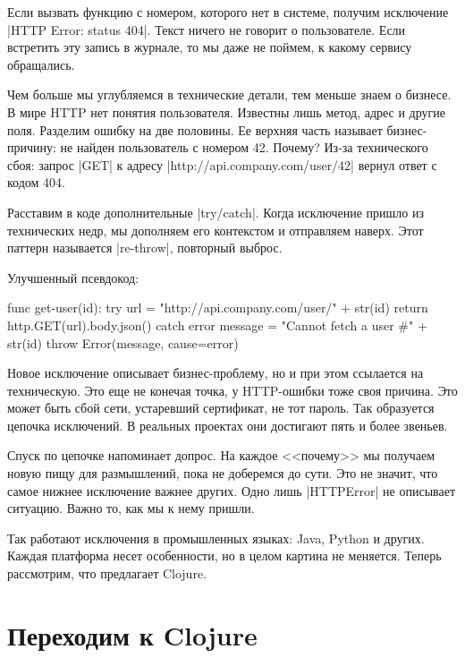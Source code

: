 Если вызвать функцию с номером, которого нет в системе, получим исключение
\spverb|HTTP Error: status 404|. Текст ничего не говорит о пользователе. Если
встретить эту запись в журнале, то мы даже не поймем, к какому сервису
обращались.

Чем больше мы углубляемся в технические детали, тем меньше знаем о бизнесе. В
мире HTTP нет понятия пользователя. Известны лишь метод, адрес и другие
поля. Разделим ошибку на две половины. Ее верхняя часть называет бизнес-причину:
не найден пользователь с номером 42. Почему? Из-за технического сбоя: запрос
\spverb|GET| к адресу \spverb|http://api.company.com/user/42| вернул ответ с
кодом 404.

Расставим в коде дополнительные \spverb|try/catch|. Когда исключение пришло из
технических недр, мы дополняем его контекстом и отправляем наверх. Этот паттерн
называется \spverb|re-throw|, повторный выброс.

Улучшенный псевдокод:

\begin{english}
  \begin{js}
func get-user(id):
  try {
    url = "http://api.company.com/user/" + str(id)
    return http.GET(url).body.json()
  } catch error {
    message = "Cannot fetch a user #" + str(id)
    throw Error(message, cause=error)
  }
  \end{js}
\end{english}

Новое исключение описывает бизнес-проблему, но и при этом ссылается на
техническую. Это еще не конечая точка, у HTTP-ошибки тоже своя причина. Это
может быть сбой сети, устаревший сертификат, не тот пароль. Так образуется
цепочка исключений. В реальных проектах они достигают пять и более звеньев.

Спуск по цепочке напоминает допрос. На каждое <<почему>> мы получаем новую пищу
для размышлений, пока не доберемся до сути. Это не значит, что самое нижнее
исключение важнее других. Одно лишь \spverb|HTTPError| не описывает
ситуацию. Важно то, как мы к нему пришли.

Так работают исключения в промышленных языках: Java, Python и других. Каждая
платформа несет особенности, но в целом картина не меняется. Теперь рассмотрим,
что предлагает Clojure.

\section{Переходим к Clojure}

